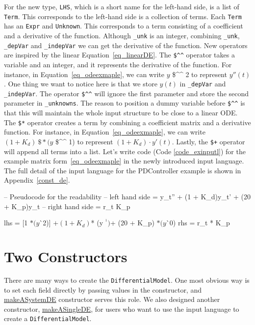 For the new type, \verb|LHS|, which is a short name for the left-hand side, is a list of \verb|Term|. This corresponds to the left-hand side is a collection of terms. Each \verb|Term| has an \verb|Expr| and \verb|Unknown|. This corresponds to a term consisting of a coefficient and a derivative of the function. Although \verb|_unk| is an integer, combining \verb|_unk|, \verb|_depVar| and \verb|_indepVar| we can get the derivative of the function. New operators are inspired by the linear Equation~\ref{eq_linearDE}. The \verb|$^^| operator takes a variable and an integer, and it represents the derivative of the function. For instance, in Equation~\ref{eq_odeexmaple}, we can write $y$ \$\^{}\^{} 2 to represent $y''(t)$. One thing we want to notice here is that we store $y(t)$ in \verb|_depVar| and \verb|_indepVar|. The operator \verb|$^^| will ignore the first parameter and store the second parameter in \verb|_unknowns|. The reason to position a dummy variable before \verb|$^^| is that this will maintain the whole input structure to be close to a linear ODE. The \verb|$*| operator creates a term by combining a coefficient matrix and a derivative function. For instance, in Equation~\ref{eq_odeexmaple}, we can write $(1 + K_d)\ \$*(y$ \$\^{}\^{} 1) to represent $(1 + K_d) \cdot y'(t)$. Lastly, the \verb|$+| operator will append all terms into a list. Let's write code (Code \ref{code_exinputl}) for the example matrix form~\ref{eq_odeexmaple} in the newly introduced input language. The full detail of the input language for the PDController example is shown in Appendix~\ref{const_de}.

\begin{listing}[ht]
\begin{haskell1}
-- Pseudocode for the readability
-- left hand side = y\_t'' + (1 + K\_d)y\_t' + (20 + K\_p)y\_t 
-- right hand side = r\_t K\_p

lhs = [1 $* (y $^^ 2)]
	$+ (1 + K_d) $* (y $^^ 1)
	$+ (20 + K_p) $* (y $^^ 0)
rhs = r_t * K_p
\end{haskell1}
\label{code_exinputl}
\end{listing}

\section{Two Constructors}
There are many ways to create the \verb|DifferentialModel|. One most obvious way is to set each field directly by passing values in the constructor, and \href{https://jacquescarette.github.io/Drasil/docs/full/drasil-lang-0.1.60.0/Language-Drasil-Chunk-DifferentialModel.html#t:makeASystemDE}{makeASystemDE} constructor serves this role. We also designed another constructor, \href{https://jacquescarette.github.io/Drasil/docs/full/drasil-lang-0.1.60.0/Language-Drasil-Chunk-DifferentialModel.html#t:makeASingleDE}{makeASingleDE}, for users who want to use the input language to create a \verb|DifferentialModel|.

